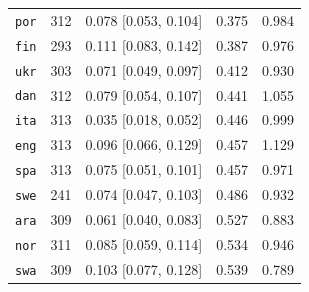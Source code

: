 \begin{table}[htbp]
\begin{minipage}[t]{0.485\linewidth}
{\begin{tabular}{@{}lrrrr@{}}
\texttt{por} & 312 & 0.078 [0.053, 0.104] & 0.375 & 0.984 \\
\texttt{fin} & 293 & 0.111 [0.083, 0.142] & 0.387 & 0.976 \\
\texttt{ukr} & 303 & 0.071 [0.049, 0.097] & 0.412 & 0.930 \\
\texttt{dan} & 312 & 0.079 [0.054, 0.107] & 0.441 & 1.055 \\
\texttt{ita} & 313 & 0.035 [0.018, 0.052] & 0.446 & 0.999 \\
\texttt{eng} & 313 & 0.096 [0.066, 0.129] & 0.457 & 1.129 \\
\texttt{spa} & 313 & 0.075 [0.051, 0.101] & 0.457 & 0.971 \\
\texttt{swe} & 241 & 0.074 [0.047, 0.103] & 0.486 & 0.932 \\
\texttt{ara} & 309 & 0.061 [0.040, 0.083] & 0.527 & 0.883 \\
\texttt{nor} & 311 & 0.085 [0.059, 0.114] & 0.534 & 0.946 \\
\texttt{swa} & 309 & 0.103 [0.077, 0.128] & 0.539 & 0.789 \\
\bottomrule
\end{tabular}}
\end{minipage}
\end{table}

